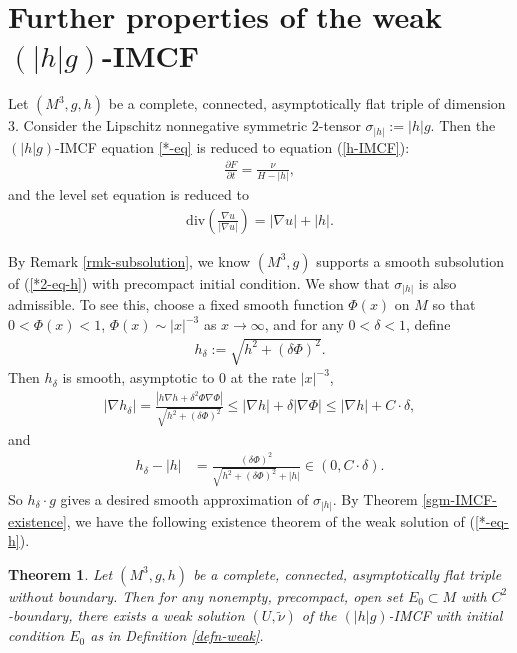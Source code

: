 \documentclass[11pt, letterpaper]{amsart}
\newtheorem{thm}{Theorem}[section]
\theoremstyle{definition}
\theoremstyle{remark}
\begin{document}
\section{Further properties of the weak $(|h|g)$-IMCF}\label{sect-hg-IMCF}
Let $(M^3, g, h)$ be a complete, connected, asymptotically flat triple of dimension $3$. Consider the Lipschitz nonnegative symmetric $2$-tensor $\sigma_{|h|} := |h| g$. Then the $(|h|g)$-IMCF equation \ref{*-eq} is reduced to equation (\ref{h-IMCF}):
\begin{align}\label{*-eq-h}
	\frac{\partial F}{\partial t} = \frac{\nu }{H - |h|},
\end{align}
and the level set equation is reduced to
\begin{align}\label{*2-eq-h}
	\mathrm{div}\left( \frac{\nabla u}{|\nabla u|} \right) = |\nabla u| + |h|.
\end{align}

By Remark \ref{rmk-subsolution}, we know $(M^3, g)$ supports a smooth subsolution of (\ref{*2-eq-h}) with precompact initial condition. We show that $\sigma _{|h|}$ is also admissible. To see this, choose a fixed smooth function $\Phi (x)$ on $M$ so that $0< \Phi (x) < 1$, $\Phi (x) \sim |x| ^{-3}$ as $x \to \infty$, and for any $0< \delta < 1$, define
	\begin{align}
		h_{\delta }:= \sqrt{h ^2 + (\delta  \Phi )^2} .
	\end{align}
	Then $h_{\delta }$ is smooth, asymptotic to $0$ at the rate $|x|^{-3}$,
\begin{align*}
	|\nabla h_{\delta }| = \frac{|h \nabla h + \delta ^2 \Phi \nabla \Phi |}{\sqrt{h ^2 + (\delta \Phi )^2} } \leq |\nabla h| + \delta |\nabla \Phi | \leq |\nabla h| + C\cdot \delta ,
\end{align*} 
and
\begin{align*}
	h_{\delta }- |h|  &= \frac{(\delta \Phi )^2}{\sqrt{h^2+ (\delta \Phi )^2} + |h|} \in (0, C\cdot \delta ).
\end{align*} 
So $h_{\delta } \cdot g$ gives a desired smooth approximation of $\sigma _{|h|}$. By Theorem \ref{sgm-IMCF-existence}, we have the following existence theorem of the weak solution of (\ref{*-eq-h}).
\begin{thm}\label{h-IMCF-existence}
	Let $(M^3, g, h)$ be a complete, connected, asymptotically flat triple without boundary. Then for any nonempty, precompact, open set $E_0 \subset M$ with $C^2$-boundary, there exists a weak solution $(U, \tilde{\nu })$ of the $(|h| g) $-IMCF  with initial condition $E_0$ as in Definition \ref{defn-weak}.
\end{thm}
\end{document}
